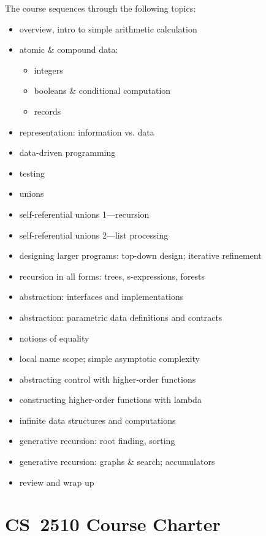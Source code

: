\documentclass[11pt]{article}
\begin{document}
The course sequences through the following topics:
\begin{itemize}
\item overview, intro to simple arithmetic calculation
\item atomic \& compound data: 
  \begin{itemize}
    \item integers
    \item booleans \& conditional computation
    \item records
  \end{itemize}
\item representation: information vs. data
\item data-driven programming
\item testing
\item unions
\item self-referential unions 1---recursion
\item self-referential unions 2---list processing
\item designing larger programs: top-down design; iterative refinement
\item recursion in all forms: trees, s-expressions, forests
\item abstraction: interfaces and implementations
\item abstraction: parametric data definitions and contracts
\item notions of equality
\item local name scope; simple asymptotic complexity
\item abstracting control with higher-order functions
\item constructing higher-order functions with lambda
\item infinite data structures and computations
\item generative recursion: root finding, sorting
\item generative recursion: graphs \& search; accumulators
\item review and wrap up
\end{itemize}


\pagebreak

\section*{CS~2510 Course Charter}
\end{document}
